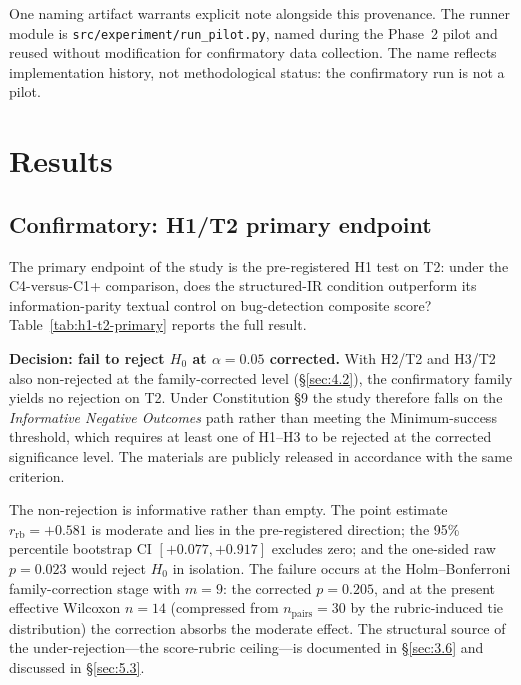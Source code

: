 \documentclass[11pt]{article}
\begin{document}
One naming artifact warrants explicit note alongside this provenance.
The runner module is \texttt{src/experiment/run\_pilot.py}, named
during the Phase~2 pilot and reused without modification for
confirmatory data collection. The name reflects implementation
history, not methodological status: the confirmatory run is not a
pilot.

\section{Results}
\label{sec:4}

\subsection{Confirmatory: H1/T2 primary endpoint}
\label{sec:4.1}
The primary endpoint of the study is the pre-registered H1 test on
T2: under the C4-versus-C1+ comparison, does the structured-IR
condition outperform its information-parity textual control on
bug-detection composite score? Table~\ref{tab:h1-t2-primary} reports
the full result.

\textbf{Decision: fail to reject $H_0$ at $\alpha = 0.05$ corrected.}
With H2/T2 and H3/T2 also non-rejected at the family-corrected
level (\S\ref{sec:4.2}), the confirmatory family yields no
rejection on T2. Under Constitution \S9 the study therefore falls
on the \emph{Informative Negative Outcomes} path rather than
meeting the Minimum-success threshold, which requires at least one
of H1--H3 to be rejected at the corrected significance level. The
materials are publicly released in accordance with the same
criterion.

The non-rejection is informative rather than empty. The point
estimate $r_{\text{rb}} = +0.581$ is moderate and lies in the
pre-registered direction; the 95\% percentile bootstrap CI
$[+0.077, +0.917]$ excludes zero; and the one-sided raw $p = 0.023$
would reject $H_0$ in isolation. The failure occurs at the
Holm--Bonferroni family-correction stage with $m = 9$: the corrected
$p = 0.205$, and at the present effective Wilcoxon $n = 14$
(compressed from $n_{\text{pairs}} = 30$ by the rubric-induced tie
distribution) the correction absorbs the moderate effect. The
structural source of the under-rejection---the score-rubric
ceiling---is documented in \S\ref{sec:3.6} and discussed in
\S\ref{sec:5.3}.
\end{document}
